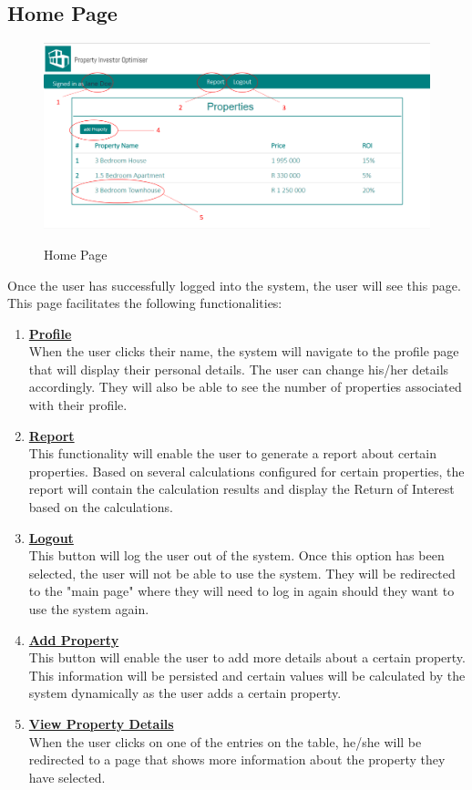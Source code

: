 \documentclass[a4paper,12pt]{article}
\begin{document}
\subsection{Home Page}
	\begin{figure}[H]
		\includegraphics[width=0.9\linewidth, center]{./System/Home.PNG}\\[0.4cm]  
		\caption{Home Page}
	\end{figure}
Once the user has successfully logged into the system, the user will see this page. This page facilitates the following functionalities:
	\begin{enumerate}
		\item{\underline{\bfseries Profile}}\\[0.2cm] 
		When the user clicks their name, the system will navigate to the profile page that will display their personal details. 				The user can change his/her details accordingly. They will also be able to see the number of properties associated 				with their profile.
		\bigskip
		\item{\underline{\bfseries Report}}\\[0.2cm] 
		This functionality will enable the user to generate a report about certain properties. Based on several calculations 				configured for certain properties, the report will contain the calculation results and display the Return of Interest based 			on the calculations. 
		\bigskip
		\item{\underline{\bfseries Logout}}\\[0.2cm] 
		This button will log the user out of the system. Once this option has been selected, the user will not be able to use the 				system. They will be redirected to the "main page" where they will need to log in again should they want to use the system 				again. 
		\bigskip
		\item{\underline{\bfseries Add Property}}\\[0.2cm] 
		This button will enable the user to add more details about a certain property. This information will be persisted and 				certain values will be calculated by the system dynamically as the user adds a certain property.
		\bigskip
		\item{\underline{\bfseries View Property Details}}\\[0.2cm] 
		When the user clicks on one of the entries on the table, he/she will be redirected to a page that shows more information 		about the property they have selected.
	\end{enumerate}
\end{document}
